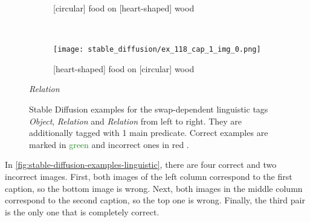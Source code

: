 \begin{figure}[ht]
\begin{minipage}[t]{.30\textwidth}
\begin{subfigure}[t]{\textwidth}
        \caption{\textcolor{BrickRed}{[circular] food on [heart-shaped] wood \xmark}}
        \end{subfigure}\\
        \begin{subfigure}[t]{\textwidth}
        \centering
        \texttt{[image: stable\_diffusion/ex\_118\_cap\_1\_img\_0.png]}
        \caption{\textcolor{BrickRed}{[heart-shaped] food on [circular] wood \xmark}}
        \end{subfigure}%
        \caption*{\textit{Relation}}
    \end{minipage}%
    \caption{Stable Diffusion examples for the swap-dependent linguistic tags \textit{Object}, \textit{Relation} and \textit{Relation} from left to right. They are additionally tagged with 1 main predicate.  Correct examples are marked in \textcolor{ForestGreen}{green \cmark} and incorrect ones in \textcolor{BrickRed}{red \xmark}.}
    \label{fig:stable-diffusion-examples}
\end{figure}

In \cref{fig:stable-diffusion-examples-linguistic}, there are four correct and two incorrect images. First, both images of the left column correspond to the first caption, so the bottom image is wrong. Next, both images in the middle column correspond to the second caption, so the top one is wrong. Finally, the third pair is the only one that is completely correct.

